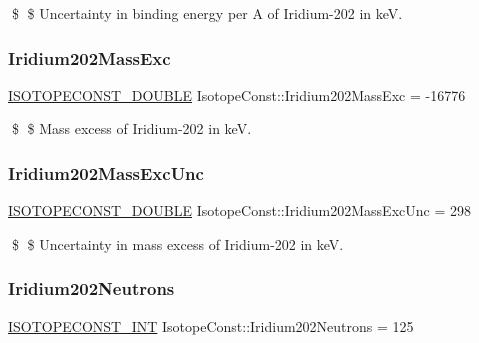 \$ \$ Uncertainty in binding energy per A of Iridium-\/202 in keV. \mbox{\label{group___isotope_const-_iridium-_ir202_gadda7aaddedcda173a2e64ee8d594ca1c}} 
\subsubsection{\texorpdfstring{Iridium202\+Mass\+Exc}{Iridium202MassExc}}
{\footnotesize\ttfamily \mbox{\hyperlink{group___isotope_const-_macros_ga8f45a7272ce02c0b4c65c44636ed719a}{I\+S\+O\+T\+O\+P\+E\+C\+O\+N\+S\+T\+\_\+\+D\+O\+U\+B\+LE}} Isotope\+Const\+::\+Iridium202\+Mass\+Exc = -\/16776}

\$ \$ Mass excess of Iridium-\/202 in keV. \mbox{\label{group___isotope_const-_iridium-_ir202_ga763b84dabc213c9c9059bdbda211eec0}} 
\subsubsection{\texorpdfstring{Iridium202\+Mass\+Exc\+Unc}{Iridium202MassExcUnc}}
{\footnotesize\ttfamily \mbox{\hyperlink{group___isotope_const-_macros_ga8f45a7272ce02c0b4c65c44636ed719a}{I\+S\+O\+T\+O\+P\+E\+C\+O\+N\+S\+T\+\_\+\+D\+O\+U\+B\+LE}} Isotope\+Const\+::\+Iridium202\+Mass\+Exc\+Unc = 298}

\$ \$ Uncertainty in mass excess of Iridium-\/202 in keV. \mbox{\label{group___isotope_const-_iridium-_ir202_gab21cd0bd51d125b4536dd6b1cde37fde}} 
\subsubsection{\texorpdfstring{Iridium202\+Neutrons}{Iridium202Neutrons}}
{\footnotesize\ttfamily \mbox{\hyperlink{group___isotope_const-_macros_ga5f18360b3e99483a35c32d789e62621c}{I\+S\+O\+T\+O\+P\+E\+C\+O\+N\+S\+T\+\_\+\+I\+NT}} Isotope\+Const\+::\+Iridium202\+Neutrons = 125}

